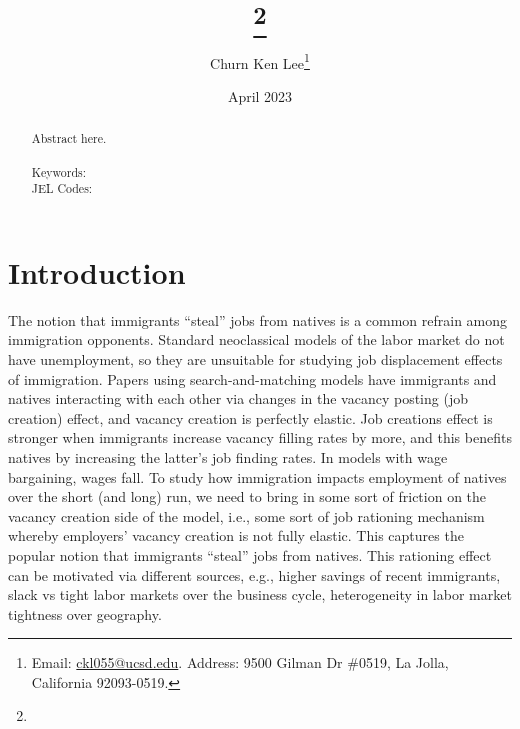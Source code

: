 \documentclass[12pt]{article}
\title{\Large \textbf{\ttitle}\thanks{\tthanks}}
\begin{document}
	\author{Churn Ken Lee\footnote{Email: \href{mailto:ckl055@ucsd.edu}{ckl055@ucsd.edu}. Address: 9500 Gilman Dr \#0519, La Jolla, California 92093-0519.}}
	\date{\small April 2023}
	
	\newcommand\ttitle{Immigration and job displacement}
	\newcommand\tthanks{Thank you to Pascal Michaillat and Munseob Lee for their guidance throughout this project.}
	\maketitle
	
	\begin{abstract}
		\vspace{1mm}
		\noindent  Abstract here.
		\\ \\
		Keywords: \\
		JEL Codes: 
	\end{abstract}
	
	\thispagestyle{empty} \newpage \setcounter{page}{1}
	
	\onehalfspace
	\renewcommand{\thetable}{\Roman{table}}

\section{Introduction}
The notion that immigrants ``steal'' jobs from natives is a common refrain among immigration opponents.
Standard neoclassical models of the labor market do not have unemployment, so they are unsuitable for studying job displacement effects of immigration.
Papers using search-and-matching models have immigrants and natives interacting with each other via changes in the vacancy posting (job creation) effect, and vacancy creation is perfectly elastic.
Job creations effect is stronger when immigrants increase vacancy filling rates by more, and this benefits natives by increasing the latter's job finding rates.
In models with wage bargaining, wages fall.
To study how immigration impacts employment of natives over the short (and long) run, we need to bring in some sort of friction on the vacancy creation side of the model, i.e., some sort of job rationing mechanism whereby employers' vacancy creation is not fully elastic.
This captures the popular notion that immigrants ``steal'' jobs from natives.
This rationing effect can be motivated via different sources, e.g., higher savings of recent immigrants, slack vs tight labor markets over the business cycle, heterogeneity in labor market tightness over geography.
\end{document}
